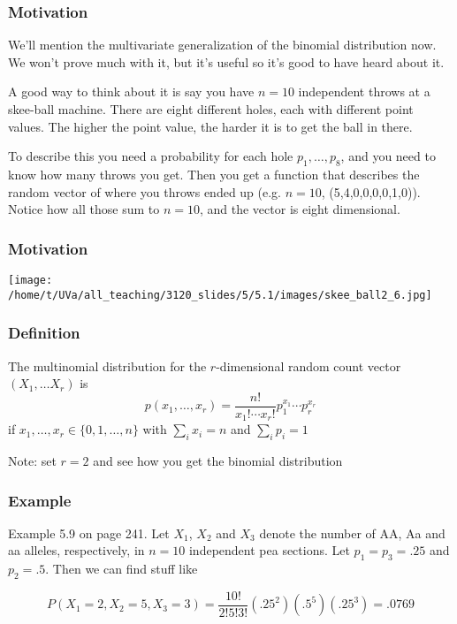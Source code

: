 \documentclass{beamer}
\begin{document}
\begin{frame}
\frametitle{Motivation}

We'll mention the multivariate generalization of the binomial distribution now. We won't prove much with it, but it's useful so it's good to have heard about it.
\newline

A good way to think about it is say you have $n=10$ independent throws at a skee-ball machine. There are eight different holes, each with different point values. The higher the point value, the harder it is to get the ball in there. 
\newline

To describe this you need a probability for each hole $p_1, \ldots, p_8$, and you need to know how many throws you get. Then you get a function that describes the random vector of where you throws ended up (e.g. $n=10$, (5,4,0,0,0,0,1,0)). Notice how all those sum to $n=10$, and the vector is eight dimensional.



\end{frame}


\begin{frame}
\frametitle{Motivation}

\begin{center}
\texttt{[image: /home/t/UVa/all\_teaching/3120\_slides/5/5.1/images/skee\_ball2\_6.jpg]}
\end{center}

\end{frame}


\begin{frame}
\frametitle{Definition}

The multinomial distribution for the $r$-dimensional random count vector $(X_1, \ldots X_r)$ is 
\[
p(x_1, \ldots, x_r) = \frac{n!}{x_1! \cdots x_r!}p_1^{x_1} \cdots p_r^{x_r}
\]
if $x_1, \ldots, x_r \in \{0, 1, \ldots, n\}$ with $\sum_i x_i = n$ and $\sum_i p_i = 1$
\newline

Note: set $r = 2$ and see how you get the binomial distribution

\end{frame}

\begin{frame}
\frametitle{Example}

Example 5.9 on page 241. Let $X_1$, $X_2$ and $X_3$ denote the number of AA, Aa and aa alleles, respectively, in $n=10$ independent pea sections. Let $p_1 = p_3 = .25$ and $p_2 = .5$. Then we can find stuff like 

\[
P(X_1 = 2, X_2= 5, X_3 = 3) = \frac{10!}{2!5!3!}(.25^2)(.5^5)(.25^3) = .0769
\]



\end{frame}
\end{document}
